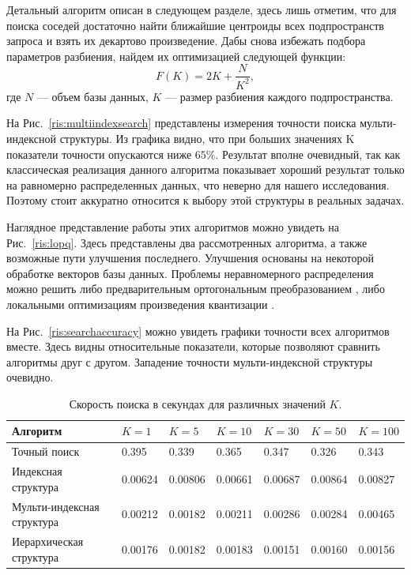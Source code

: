 Детальный алгоритм описан в следующем разделе, здесь лишь отметим, что для поиска соседей достаточно найти ближайшие центроиды всех подпространств запроса и взять их декартово произведение. Дабы снова избежать подбора параметров разбиения, найдем их оптимизацией следующей функции:
\begin{equation}\label{eq:multiindex}
F(K)= 2K + \frac{N}{K^2},
\end{equation}
где $N$ — объем базы данных, $K$ — размер разбиения каждого подпространства. 

На Рис.~\ref{ris:multiindexsearch} представлены измерения точности поиска мульти-индексной структуры. Из графика видно, что при больших значениях K показатели точности опускаются ниже $65\%$. Результат вполне очевидный, так как классическая реализация данного алгоритма показывает хороший результат только на равномерно распределенных данных, что неверно для нашего исследования. Поэтому стоит аккуратно относится к выбору этой структуры в реальных задачах.

Наглядное представление работы этих алгоритмов можно увидеть на Рис.~\ref{ris:lopq}. Здесь представлены два рассмотренных алгоритма, а также возможные пути улучшения последнего. Улучшения основаны на некоторой обработке векторов базы данных. Проблемы неравномерного распределения можно решить либо предварительным ортогональным преобразованием \cite{4,6}, либо локальными оптимизациям произведения квантизации \cite{5}.

На Рис.~\ref{ris:searchaccuracy} можно увидеть графики точности всех алгоритмов вместе. Здесь видны относительные показатели, которые позволяют сравнить алгоритмы друг с другом. Западение точности мульти-индексной структуры очевидно.

\begin{table}[h!]
\begin{tabular}{ | l | l | l | l | l | l | l | }
\hline
Алгоритм & $K = 1$ & $K = 5$ & $K = 10$ & $K = 30$ & $K = 50$ & $K = 100$  \\ \hline
Точный поиск & 0.395 & 0.339 & 0.365 & 0.347 & 0.326 & 0.343 \\
Индексная структура &0.00624 & 0.00806 & 0.00661 & 0.00687 & 0.00864 & 0.00827 \\
Мульти-индексная структура & 0.00212 & 0.00182 & 0.00211 & 0.00286 & 0.00284 & 0.00465 \\
Иерархическая структура & 0.00176 & 0.00182 & 0.00183 & 0.00151 & 0.00160 & 0.00156\\
\hline
\end{tabular}
\caption{Скорость поиска в секундах для различных значений $K$.}
\label{tab:results}
\end{table}

